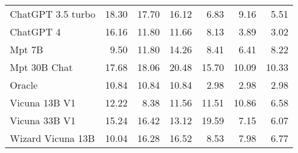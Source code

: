 \begin{table}[!htbp]
\begin{tabular}{l|rrr|rrr}
ChatGPT 3.5 turbo & {\cellcolor[HTML]{91017A}} \color[HTML]{F1F1F1} 18.30 & {\cellcolor[HTML]{A5017D}} \color[HTML]{F1F1F1} 17.70 & {\cellcolor[HTML]{D82E94}} \color[HTML]{F1F1F1} 16.12 & {\cellcolor[HTML]{D0EDE9}} \color[HTML]{000000} 6.83 & {\cellcolor[HTML]{9AD8CA}} \color[HTML]{000000} 9.16 & {\cellcolor[HTML]{E0F3F5}} \color[HTML]{000000} 5.51 \\
ChatGPT 4 & {\cellcolor[HTML]{D62D93}} \color[HTML]{F1F1F1} 16.16 & {\cellcolor[HTML]{FBBBBD}} \color[HTML]{000000} 11.80 & {\cellcolor[HTML]{FCBFBE}} \color[HTML]{000000} 11.66 & {\cellcolor[HTML]{B4E2D8}} \color[HTML]{000000} 8.13 & {\cellcolor[HTML]{EFF9FB}} \color[HTML]{000000} 3.89 & {\cellcolor[HTML]{F7FCFD}} \color[HTML]{000000} 3.02 \\
Mpt 7B & {\cellcolor[HTML]{FEE6E3}} \color[HTML]{000000} 9.50 & {\cellcolor[HTML]{FBBBBD}} \color[HTML]{000000} 11.80 & {\cellcolor[HTML]{F76EA3}} \color[HTML]{F1F1F1} 14.26 & {\cellcolor[HTML]{ADE0D4}} \color[HTML]{000000} 8.41 & {\cellcolor[HTML]{D5EFED}} \color[HTML]{000000} 6.41 & {\cellcolor[HTML]{B2E2D7}} \color[HTML]{000000} 8.22 \\
Mpt 30B Chat & {\cellcolor[HTML]{A6017D}} \color[HTML]{F1F1F1} 17.68 & {\cellcolor[HTML]{99017B}} \color[HTML]{F1F1F1} 18.06 & {\cellcolor[HTML]{49006A}} \color[HTML]{F1F1F1} 20.48 & {\cellcolor[HTML]{1F8742}} \color[HTML]{F1F1F1} 15.70 & {\cellcolor[HTML]{84CFB9}} \color[HTML]{000000} 10.09 & {\cellcolor[HTML]{7DCCB5}} \color[HTML]{000000} 10.33 \\
Oracle & {\cellcolor[HTML]{FCCFCB}} \color[HTML]{000000} 10.84 & {\cellcolor[HTML]{FCCFCB}} \color[HTML]{000000} 10.84 & {\cellcolor[HTML]{FCCFCB}} \color[HTML]{000000} 10.84 & {\cellcolor[HTML]{F7FCFD}} \color[HTML]{000000} 2.98 & {\cellcolor[HTML]{F7FCFD}} \color[HTML]{000000} 2.98 & {\cellcolor[HTML]{F7FCFD}} \color[HTML]{000000} 2.98 \\
Vicuna 13B V1 & {\cellcolor[HTML]{FBB0BA}} \color[HTML]{000000} 12.22 & {\cellcolor[HTML]{FFF7F3}} \color[HTML]{000000} 8.38 & {\cellcolor[HTML]{FCC1BF}} \color[HTML]{000000} 11.56 & {\cellcolor[HTML]{62C09F}} \color[HTML]{000000} 11.51 & {\cellcolor[HTML]{70C6AC}} \color[HTML]{000000} 10.86 & {\cellcolor[HTML]{D3EEEB}} \color[HTML]{000000} 6.58 \\
Vicuna 33B V1 & {\cellcolor[HTML]{E94B9C}} \color[HTML]{F1F1F1} 15.24 & {\cellcolor[HTML]{CD238F}} \color[HTML]{F1F1F1} 16.42 & {\cellcolor[HTML]{FA97B2}} \color[HTML]{000000} 13.12 & {\cellcolor[HTML]{00441B}} \color[HTML]{F1F1F1} 19.59 & {\cellcolor[HTML]{CCECE6}} \color[HTML]{000000} 7.15 & {\cellcolor[HTML]{D9F1F0}} \color[HTML]{000000} 6.07 \\
Wizard Vicuna 13B & {\cellcolor[HTML]{FDDDDA}} \color[HTML]{000000} 10.04 & {\cellcolor[HTML]{D22891}} \color[HTML]{F1F1F1} 16.28 & {\cellcolor[HTML]{CA208D}} \color[HTML]{F1F1F1} 16.52 & {\cellcolor[HTML]{AADFD3}} \color[HTML]{000000} 8.53 & {\cellcolor[HTML]{B8E4DB}} \color[HTML]{000000} 7.98 & {\cellcolor[HTML]{D1EEE9}} \color[HTML]{000000} 6.77 \\

\bottomrule
\end{tabular}
            
\end{table}
